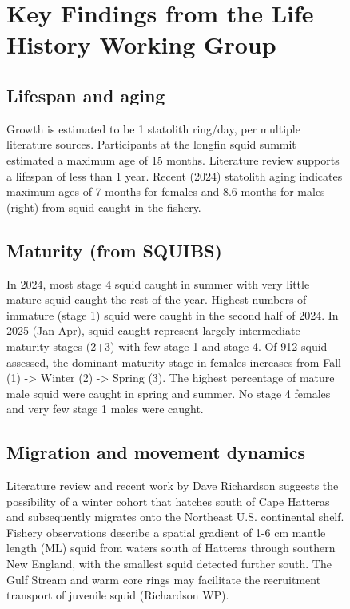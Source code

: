 \documentclass[
  8.5pt,
  letterpaper,
]{article}
\begin{document}
\begin{figure}

\begin{minipage}{0.57\linewidth}

\raggedright
\section{Key Findings from the Life History Working Group}

\subsection{Lifespan and aging}

Growth is estimated to be 1 statolith ring/day, per multiple literature
sources. Participants at the longfin squid summit estimated a maximum
age of 15 months. Literature review supports a lifespan of less than 1
year. Recent (2024) statolith aging indicates maximum ages of 7 months
for females and 8.6 months for males (right) from squid caught in the
fishery.

\vspace{0.25cm}

\subsection{Maturity (from SQUIBS)}

In 2024, most stage 4 squid caught in summer with very little mature
squid caught the rest of the year. Highest numbers of immature (stage 1)
squid were caught in the second half of 2024. In 2025 (Jan-Apr), squid
caught represent largely intermediate maturity stages (2+3) with few
stage 1 and stage 4. Of 912 squid assessed, the dominant maturity stage
in females increases from Fall (1) -\textgreater{} Winter (2)
-\textgreater{} Spring (3). The highest percentage of mature male squid
were caught in spring and summer. No stage 4 females and very few stage
1 males were caught.

\vspace{0.25cm}

\subsection{Migration and movement dynamics}

Literature review and recent work by Dave Richardson suggests the
possibility of a winter cohort that hatches south of Cape Hatteras and
subsequently migrates onto the Northeast U.S. continental shelf. Fishery
observations describe a spatial gradient of 1-6 cm mantle length (ML)
squid from waters south of Hatteras through southern New England, with
the smallest squid detected further south. The Gulf Stream and warm core
rings may facilitate the recruitment transport of juvenile squid
(Richardson WP).


\end{minipage}
\end{figure}
\end{document}

